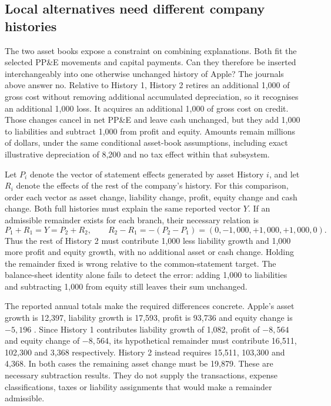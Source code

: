 \subsection{Local alternatives need different company histories}

The two asset books expose a constraint on combining explanations. Both fit
the selected PP\&E movements and capital payments. Can they therefore be
inserted interchangeably into one otherwise unchanged history of Apple?
The journals above answer no. Relative to History 1, History 2 retires an
additional 1,000 of gross cost without removing additional accumulated
depreciation, so it recognises an additional 1,000 loss. It acquires an
additional 1,000 of gross cost on credit. Those changes cancel in net PP\&E
and leave cash unchanged, but they add 1,000 to liabilities and subtract
1,000 from profit and equity. Amounts remain millions of dollars, under the
same conditional asset-book assumptions, including exact illustrative
depreciation of 8,200 and no tax effect within that subsystem.

Let $P_i$ denote the vector of statement effects generated by asset History
$i$, and let $R_i$ denote the effects of the rest of the company's history.
For this comparison, order each vector as asset change, liability change,
profit, equity change and cash change. Both full histories must explain the
same reported vector $Y$. If an admissible remainder exists for each branch,
their necessary relation is
\[
P_1+R_1=Y=P_2+R_2,
\qquad
R_2-R_1=-(P_2-P_1)=(0,-1{,}000,+1{,}000,+1{,}000,0).
\]
Thus the rest of History 2 must contribute 1,000 less liability growth and
1,000 more profit and equity growth, with no additional asset or cash change.
Holding the remainder fixed is wrong relative to the common-statement target.
The balance-sheet identity alone fails to detect the error: adding 1,000 to
liabilities and subtracting 1,000 from equity still leaves their sum unchanged.

The reported annual totals make the required differences concrete. Apple's
asset growth is 12,397, liability growth is 17,593, profit is 93,736 and equity
change is $-5{,}196$ \citep[printed pp.~29--32]{apple2024}. Since History 1
contributes liability growth of 1,082, profit of $-8{,}564$ and equity change
of $-8{,}564$, its hypothetical remainder must contribute 16,511, 102,300
and 3,368 respectively. History 2 instead requires 15,511, 103,300 and
4,368. In both cases the remaining asset change must be 19,879. These are
necessary subtraction results. They do not supply the transactions, expense
classifications, taxes or liability assignments that would make a remainder
admissible.


